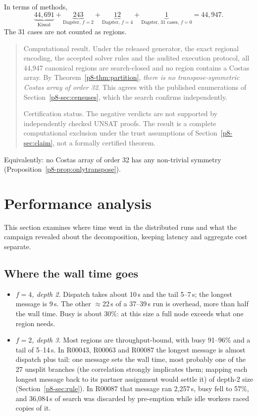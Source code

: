\documentclass[11pt,a4paper,oneside]{report}
\theoremstyle{definition}
\newcommand{\st}[1]{\textsf{#1}}
\begin{document}
\noindent In terms of methods,
\[
\underbrace{44{,}691}_{\text{Kissat}}
+\underbrace{243}_{\text{Dagster, }f=2}
+\underbrace{12}_{\text{Dagster, }f=4}
+\underbrace{1}_{\text{Dagster, 31 cases, }f=0}
=44{,}947 .
\]
The 31 cases are not counted as regions.

\begin{quote}
Computational result. Under the released generator, the exact regional encoding, the
accepted solver rules and the audited execution protocol, all 44{,}947 canonical regions are
\st{search-closed} and no region contains a Costas array. By Theorem~\ref{p8-thm:partition},
\emph{there is no transpose-symmetric Costas array of order 32}. This agrees with the published
enumerations of Section~\ref{p8-sec:censuses}, which the search confirms independently.

Certification status. The negative verdicts are not supported by independently
checked UNSAT proofs. The result is a complete computational exclusion under the trust
assumptions of Section~\ref{p8-sec:claim}, not a formally certified theorem.
\end{quote}

Equivalently: no Costas array of order 32 has any non-trivial symmetry
(Proposition~\ref{p8-prop:onlytranspose}).

\section{Performance analysis}\label{p8-sec:perf}
This section examines where time went in the distributed runs and what the campaign revealed about the decomposition, keeping latency and aggregate cost separate.


\subsection{Where the wall time goes}
\begin{itemize}
\item \emph{$f=4$, depth 2.} Dispatch takes about 10\,s and the tail 5--7\,s; the longest message
is 9\,s. The other $\approx$22\,s of a 37--39\,s run is overhead, more than half the wall time.
Busy is about 30\%: at this size a full node exceeds what one region needs.
\item \emph{$f=2$, depth 3.} Most regions are throughput-bound, with busy 91--96\% and a tail of
5--14\,s. In R00043, R00063 and R00087 the longest message is almost dispatch plus tail: one
message sets the wall time, most probably one of the 27 unsplit branches (the correlation strongly implicates them; mapping
each longest message back to its partner assignment would settle it) of depth-2 size
(Section~\ref{p8-sec:rule}). In R00087 that message ran 2{,}257\,s, busy fell to 57\%, and
36{,}084\,s of search was discarded by pre-emption while idle workers raced copies of it.
\end{itemize}
\end{document}
